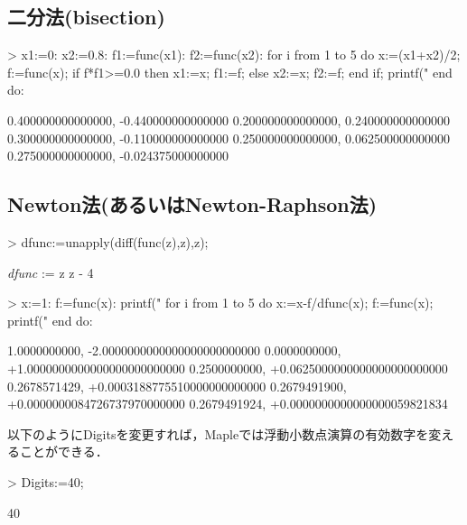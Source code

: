 \subsection{二分法(bisection)}
\begin{MapleInput}
> x1:=0: x2:=0.8: 
  f1:=func(x1): f2:=func(x2): 
  for i from 1 to 5 do 
    x:=(x1+x2)/2;
    f:=func(x); 
    if f*f1>=0.0 then 
      x1:=x; f1:=f; 
    else 
      x2:=x; f2:=f; 
    end if;
    printf("%
  end do:
\end{MapleInput}
\begin{MapleError}
0.400000000000000, -0.440000000000000 
0.200000000000000,  0.240000000000000
0.300000000000000, -0.110000000000000 
0.250000000000000,  0.062500000000000
0.275000000000000, -0.024375000000000
\end{MapleError}

\subsection{Newton法(あるいはNewton-Raphson法)}

\begin{MapleInput}
> dfunc:=unapply(diff(func(z),z),z);
\end{MapleInput}
\begin{MapleOutput}
{\it dfunc} := z z - 4
\end{MapleOutput}
\begin{MapleInput}
> x:=1: f:=func(x): 
  printf("%
  for i from 1 to 5 do
    x:=x-f/dfunc(x); 
    f:=func(x); 
    printf("%
  end do:
\end{MapleInput}
\begin{MapleError}
1.0000000000, -2.0000000000000000000000000 
0.0000000000, +1.0000000000000000000000000 
0.2500000000, +0.0625000000000000000000000
0.2678571429, +0.0003188775510000000000000 
0.2679491900, +0.0000000084726737970000000 
0.2679491924, +0.0000000000000000059821834
\end{MapleError}

以下のようにDigitsを変更すれば，Mapleでは浮動小数点演算の有効数字を変えることができる．
\begin{MapleInput}
> Digits:=40;
\end{MapleInput}
\begin{MapleOutput}
40
\end{MapleOutput}

